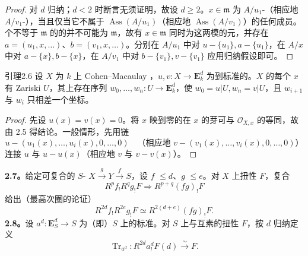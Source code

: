 \begin{proof}
对 $d$ 归纳；$d<2$ 时断言无须证明，故设 $d\ge2$。$x\in\mathfrak m$ 为 $A/u_1$-（相应地 $A/v_1$-），当且仅当它不属于 $\operatorname{Ass}(A/u_1)$（相应地 $\operatorname{Ass}(A/v_1)$）的任何成员。个不等于 $\mathfrak m$ 的的并不可能为 $\mathfrak m$，故有 $x\in\mathfrak m$ 同时为这两模的元，并存在 $a=(u_1,x,\ldots)$、$b=(v_1,x,\ldots)$。分别在 $A/u_1$ 中对 $u-\{u_1\},a-\{u_1\}$，在 $A/x$ 中对 $a-\{x\},b-\{x\}$，在 $A/v_1$ 中对 $b-\{v_1\},v-\{v_1\}$ 应用归纳假设即可。
\end{proof}
\begin{SGAresult}{引理}{2.6}
设 $X$ 为 $k$ 上 Cohen--Macaulay ，$u,v:X\to\mathbf E^d_k$ 为到标准的。$X$ 的每个 $x$ 有 Zariski  $U$，其上存在序列 $w_0,\ldots,w_n:U\to\mathbf E^d_k$，使 $w_0=u|U,w_n=v|U$，且 $w_{i+1}$ 与 $w_i$ 只相差一个坐标。
\end{SGAresult}
\begin{proof}
先设 $u(x)=v(x)=0$。将 $x$ 映到零的在 $x$ 的芽可与 $\mathcal O_{X,x}$ 的等同，故由 2.5 得结论。一般情形，先用链
\[u-(u_1(x),\ldots,u_i(x),0,\ldots,0)\quad\text{（相应地 }v-(v_1(x),\ldots,v_i(x),0,\ldots,0)\text{）}\]
连接 $u$ 与 $u-u(x)$（相应地 $v$ 与 $v-v(x)$）。
\end{proof}
\textbf{2.7。}给定可复合的 $S$- $X\xrightarrow gY\xrightarrow fS$，设 $f$  $\le d$、$g$  $\le e$。对 $X$ 上扭性 $F$，复合
\[R^pf_!R^qg_!F\Longrightarrow R^{p+q}(fg)_!F\tag{2.7.1}\]
给出（最高次圈的论证）
\[R^{2d}f_!R^{2e}g_!F\simeq R^{2(d+e)}(fg)_!F.\tag{2.7.2}\]
\textbf{2.8。}设 $a^d:\mathbf E^d_S\to S$ 为（即）$S$ 上的标准。对 $S$ 上与互素的扭性 $F$，按 $d$ 归纳定义
\[\operatorname{Tr}_{a^d}:R^{2d}a^d_!F(d)\xrightarrow\sim F.\tag{2.8.1}\]
